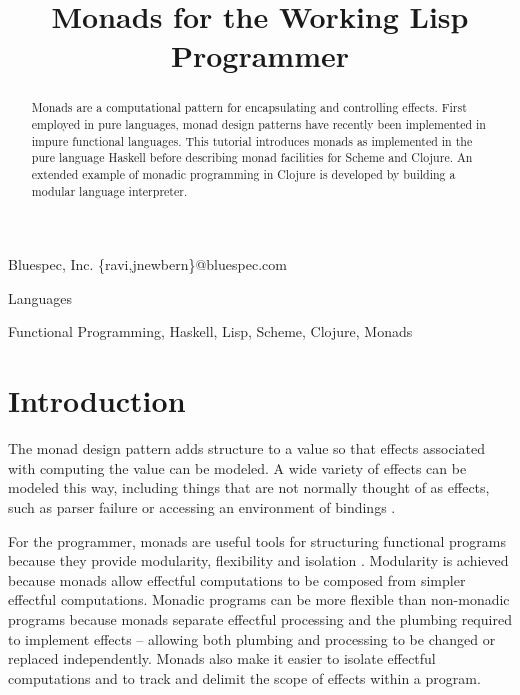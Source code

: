 \documentclass[natbib,10pt]{sigplanconf}
\begin{document}
\copyrightdata{[to be supplied]}
\toappear{}


\title{Monads for the Working Lisp Programmer}

           {Bluespec, Inc.}
           {\{ravi,jnewbern\}@bluespec.com}

\maketitle

\begin{abstract}

Monads are a computational pattern for encapsulating and controlling
effects.  First employed in pure languages, monad design patterns have
recently been implemented in impure functional languages.  This
tutorial introduces monads as implemented in the pure language Haskell
before describing monad facilities for Scheme and Clojure.  An extended
example of monadic programming in Clojure is developed by building a
modular language interpreter.

\end{abstract}


\terms
Languages

\keywords
Functional Programming, Haskell, Lisp, Scheme, Clojure, Monads

\section{Introduction}

The monad design pattern adds structure to a value so that effects
associated with computing the value can be modeled.  A wide variety of
effects can be modeled this way, including things that are not
normally thought of as effects, such as parser failure or accessing an
environment of bindings
\citep{moggi-monads,wadlermonads, parser-combinators}.

For the programmer, monads are useful tools for structuring functional
programs because they provide modularity, flexibility and isolation
\citep{all-about-monads, pureshirt}.
Modularity is achieved because monads allow effectful computations to
be composed from simpler effectful computations. Monadic programs can be
more flexible than non-monadic programs because monads separate
effectful processing and the plumbing required to implement effects --
allowing both plumbing and processing to be changed or replaced
independently. Monads also make it easier to isolate effectful
computations and to track and delimit the scope of effects within a
program.
\end{document}
